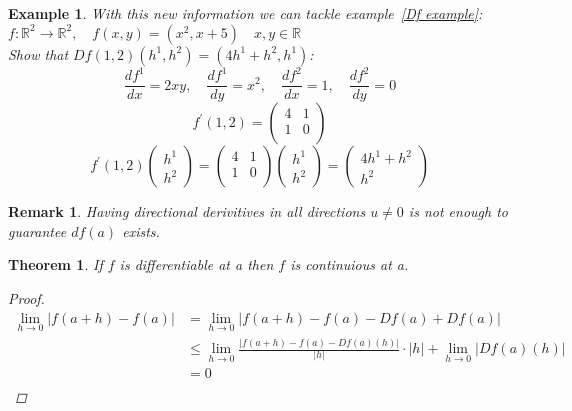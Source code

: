 \documentclass[12pt]{article}
\def\RR{\mathbb{R}}
\newtheorem{theorem}{Theorem}[section]
\newtheorem{example}{Example}[section]
\newtheorem*{remark}{Remark}
\begin{document}
\begin{example} With this new information we can tackle example~\ref{Df example}:\\
$f:\RR^{2} \rightarrow \RR^{2}, \quad f(x,y)=(x^{2},x+5) \quad x,y \in \RR$\\
Show that $Df(1,2)(h^{1}, h^{2})=(4h^{1} +  h^{2}, h^{1})$:
\[\frac{df^{1}}{dx} = 2xy, \quad \frac{df^{1}}{dy} = x^{2}, \quad \frac{df^{2}}{dx} = 1, \quad \frac{df^{2}}{dy} = 0\]
\[f^{'}(1,2)=\begin{pmatrix}
 4&1 \\
  1&0 \\
 \end{pmatrix}\]
\[f^{'}(1,2) \left(\!\! \begin{array}{c} h^{1} \\  h^{2} \end{array}\!\! \right)= \begin{pmatrix}
 4&1 \\
  1&0 \\
 \end{pmatrix}\!\!\! \left(\!\! \begin{array}{c} h^{1} \\  h^{2} \end{array}\!\! \right)=  \left(\!\!\! \begin{array}{c} 4h^{1} + h^{2}\\  h^{2} \end{array}\!\! \right)\]
\end{example}

\begin{remark}
Having  directional derivitives in all directions $u\neq 0$ is not enough to guarantee $df(a)$ exists.
\end{remark}

\begin{theorem}
If $f$ is differentiable at a then $f$ is continuious at a.
\begin{proof}
\begin{align*}
\lim_{h \to 0}|f(a+h)-f(a)| &= \lim_{h \to 0}|f(a+h)-f(a) -Df(a) + Df(a)|\\
&\leq \lim_{h \to 0}\frac{|f(a+h)-f(a) -Df(a)(h)|}{|h|}\cdot|h| + \lim_{h \to 0}| Df(a)(h)|\\ 
&= 0 \\
\end{align*}
\end{proof}
\end{theorem}
\end{document}
